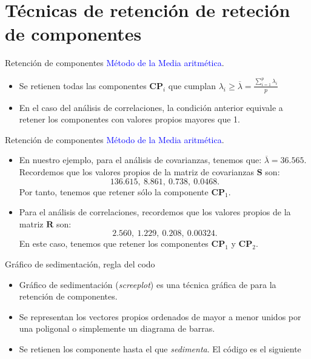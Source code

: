\documentclass[
  ignorenonframetext,
]{beamer}
\newcommand\blue[1]{\textcolor{blue}{#1}}
\begin{document}
\hypertarget{tuxe9cnicas-de-retenciuxf3n-de-reteciuxf3n-de-componentes}{%
\section{Técnicas de retención de reteción de
componentes}\label{tuxe9cnicas-de-retenciuxf3n-de-reteciuxf3n-de-componentes}}

\begin{frame}{Retención de componentes}
\protect\hypertarget{retenciuxf3n-de-componentes-2}{}
\blue{Método de la Media aritmética}.

\begin{itemize}
\item
  Se retienen todas las componentes \(\mathbf{CP}_i\) que cumplan
  \(\lambda_i\geq\overline{\lambda}=\frac{\sum_{i=1}^p \lambda_i}{p}\)
\item
  En el caso del análisis de correlaciones, la condición anterior
  equivale a retener los componentes con valores propios mayores que 1.
\end{itemize}
\end{frame}

\begin{frame}{Retención de componentes}
\protect\hypertarget{retenciuxf3n-de-componentes-3}{}
\blue{Método de la Media aritmética}.

\begin{itemize}
\item
  En nuestro ejemplo, para el análisis de covarianzas, tenemos que:
  \(\overline{\lambda}=36.565\). Recordemos que los valores propios de
  la matriz de covarianzas \(\mathbf{S}\) son:
  \[136.615,\ 8.861,\ 0.738,\ 0.0468.\] Por tanto, tenemos que retener
  sólo la componente \(\mathbf{CP}_1\).
\item
  Para el análisis de correlaciones, recordemos que los valores propios
  de la matriz \(\mathbf{R}\) son: \[2.560,\ 1.229,\ 0.208,\ 0.00324.\]
  En este caso, tenemos que retener los componentes \(\mathbf{CP}_1\) y
  \(\mathbf{CP}_2\).
\end{itemize}
\end{frame}

\begin{frame}{Gráfico de sedimentación, regla del codo}
\protect\hypertarget{gruxe1fico-de-sedimentaciuxf3n-regla-del-codo}{}
\begin{itemize}
\item
  Gráfico de sedimentación (\emph{screeplot}) es una técnica gráfica de
  para la retención de componentes.
\item
  Se representan los vectores propios ordenados de mayor a menor unidos
  por una poligonal o simplemente un diagrama de barras.
\item
  Se retienen los componente hasta el que \emph{sedimenta}. El código es
  el siguiente
\end{itemize}
\end{frame}
\end{document}
